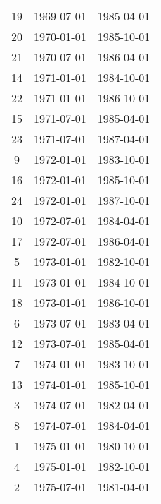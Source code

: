 % 
\begin{tabular}{ccc}
  \hline
  \hline
19 & 1969-07-01 & 1985-04-01 \\ 
  20 & 1970-01-01 & 1985-10-01 \\ 
  21 & 1970-07-01 & 1986-04-01 \\ 
  14 & 1971-01-01 & 1984-10-01 \\ 
  22 & 1971-01-01 & 1986-10-01 \\ 
  15 & 1971-07-01 & 1985-04-01 \\ 
  23 & 1971-07-01 & 1987-04-01 \\ 
  9 & 1972-01-01 & 1983-10-01 \\ 
  16 & 1972-01-01 & 1985-10-01 \\ 
  24 & 1972-01-01 & 1987-10-01 \\ 
  10 & 1972-07-01 & 1984-04-01 \\ 
  17 & 1972-07-01 & 1986-04-01 \\ 
  5 & 1973-01-01 & 1982-10-01 \\ 
  11 & 1973-01-01 & 1984-10-01 \\ 
  18 & 1973-01-01 & 1986-10-01 \\ 
  6 & 1973-07-01 & 1983-04-01 \\ 
  12 & 1973-07-01 & 1985-04-01 \\ 
  7 & 1974-01-01 & 1983-10-01 \\ 
  13 & 1974-01-01 & 1985-10-01 \\ 
  3 & 1974-07-01 & 1982-04-01 \\ 
  8 & 1974-07-01 & 1984-04-01 \\ 
  1 & 1975-01-01 & 1980-10-01 \\ 
  4 & 1975-01-01 & 1982-10-01 \\ 
  2 & 1975-07-01 & 1981-04-01 \\ 
   \hline
\end{tabular}
